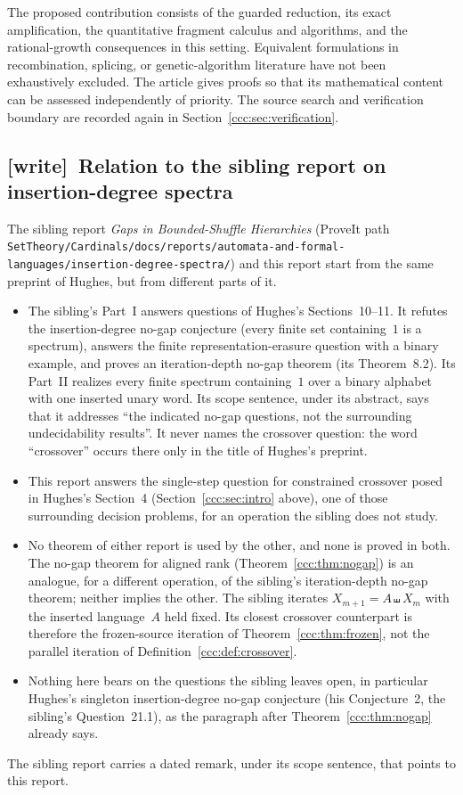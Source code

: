 \documentclass[11pt,letterpaper]{article}
\theoremstyle{definition}
\theoremstyle{remark}
\newcommand{\sh}{\mathbin{\shuffle}}
\newcommand{\wtag}{\textup{[write]}}
\begin{document}
The proposed contribution consists of the guarded reduction, its exact
amplification, the quantitative fragment calculus and algorithms, and the
rational-growth consequences in this setting. Equivalent formulations in
recombination, splicing, or genetic-algorithm literature have not been
exhaustively excluded. The article gives proofs so that its mathematical
content can be assessed independently of priority. The source search and
verification boundary are recorded again in Section~\ref{ccc:sec:verification}.

\subsection{\texorpdfstring{\wtag\ }{}Relation to the sibling report on insertion-degree spectra}
\label{ccc:sec:sibling}

The sibling report \emph{Gaps in Bounded-Shuffle Hierarchies} (ProveIt path
\nolinkurl{SetTheory/Cardinals/docs/reports/automata-and-formal-languages/insertion-degree-spectra/})
and this report start from the same preprint of Hughes, but from different
parts of it.
\begin{itemize}[leftmargin=1.4em,itemsep=2pt]
\item The sibling's Part~I answers questions of Hughes's Sections~10--11. It
 refutes the insertion-degree no-gap conjecture (every finite set containing~$1$
 is a spectrum), answers the finite representation-erasure question with a
 binary example, and proves an iteration-depth no-gap theorem (its
 Theorem~8.2). Its Part~II realizes every finite spectrum containing~$1$ over a
 binary alphabet with one inserted unary word. Its scope sentence, under its
 abstract, says that it addresses ``the indicated no-gap questions, not the
 surrounding undecidability results''. It never names the crossover question:
 the word ``crossover'' occurs there only in the title of Hughes's preprint.
\item This report answers the single-step question for constrained crossover
 posed in Hughes's Section~4 (Section~\ref{ccc:sec:intro} above), one of those
 surrounding decision problems, for an operation the sibling does not study.
\item No theorem of either report is used by the other, and none is proved in
 both. The no-gap theorem for aligned rank (Theorem~\ref{ccc:thm:nogap}) is an
 analogue, for a different operation, of the sibling's iteration-depth no-gap
 theorem; neither implies the other. The sibling iterates $X_{m+1}=A\sh X_m$
 with the inserted language~$A$ held fixed. Its closest crossover counterpart
 is therefore the frozen-source iteration of Theorem~\ref{ccc:thm:frozen}, not
 the parallel iteration of Definition~\ref{ccc:def:crossover}.
\item Nothing here bears on the questions the sibling leaves open, in
 particular Hughes's singleton insertion-degree no-gap conjecture (his
 Conjecture~2, the sibling's Question~21.1), as the paragraph after
 Theorem~\ref{ccc:thm:nogap} already says.
\end{itemize}
The sibling report carries a dated remark, under its scope sentence, that
points to this report.
\end{document}
